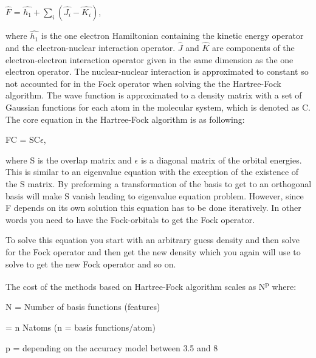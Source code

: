 \documentclass[twoside]{article}
\begin{document}
$\hat{F}$ = $\hat{h_1} + \sum\limits_{i}(\hat{J_i} - \hat{K_i})$,

where $\hat{h_1}$ is the one electron Hamiltonian containing the kinetic energy operator and the electron-nuclear interaction operator. $\hat{J}$ and $\hat{K}$ are components of the electron-electron interaction operator given in the same dimension as the one electron operator. The nuclear-nuclear interaction is approximated to constant so not accounted for in the Fock operator when solving 
the the Hartree-Fock algorithm. The wave function is approximated to a density matrix with a set of Gaussian functions for each atom in the molecular system, which is denoted as C. The core equation in the Hartree-Fock algorithm is as following:


% 
% 


FC = SC$\epsilon$,

where S is the overlap matrix and $\epsilon$ is a diagonal matrix of the orbital energies. This is similar to an eigenvalue equation with the exception of the existence of the S matrix. By preforming a transformation of the basis to get to an orthogonal basis will make S vanish leading to eigenvalue equation problem. However, since F depends on its own solution this equation has to be done iteratively. In other words you need to have the Fock-orbitals to get the Fock operator. 

To solve this equation you start with an arbitrary guess density and then solve for the Fock operator and then get the new density which you again will use to solve to get the new Fock operator and so on. 

The cost of the methods based on Hartree-Fock algorithm scales as N\textsuperscript{p} where: 

N = Number of basis functions (features) 

= n Natoms  (n = basis functions/atom)  

p  = depending on the accuracy model between 3.5 and 8\cite{frisch1996exploring}
\end{document}

